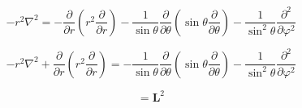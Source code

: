 \documentclass[12pt]{article}
\begin{document}
\[
    - r^2 \nabla^2 =
    - \frac{\partial}{\partial r} \left(r^2 \frac{\partial}{\partial r}\right)
    - \frac{1}{\sin{\theta}}\frac{\partial}{\partial \theta}
    \left(\sin{\theta} \frac{\partial}{\partial \theta}\right)
    - \frac{1}{\sin^2{\theta}} \frac{\partial^2}{\partial \varphi^2}
\]

\[
    - r^2 \nabla^2 + \frac{\partial}{\partial r} \left(r^2 \frac{\partial}{\partial r}\right)
    = - \frac{1}{\sin{\theta}} \frac{\partial}{\partial \theta}
    \left(\sin{\theta} \frac{\partial}{\partial \theta}\right)
    - \frac{1}{\sin^2{\theta}} \frac{\partial^2}{\partial \varphi^2}
\]

\[
    = \textbf{L}^2
\]



\nocite{arfken2013mathematical}
\nocite{El-Deeb_PEU-356_Assignments}
\end{document}
